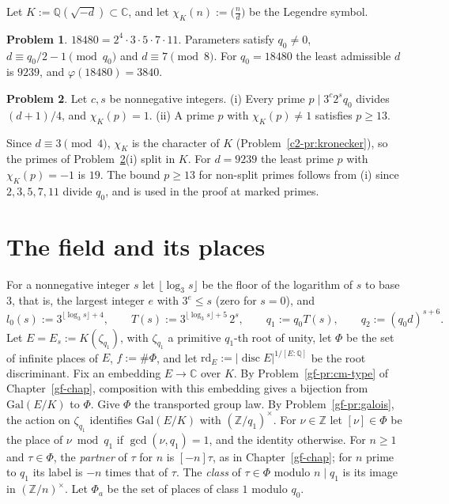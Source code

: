 \documentclass[reqno]{amsart}
\newcounter{chap}
\theoremstyle{plain}
\theoremstyle{definition}
\newtheorem{problem}{Problem}[section]
\newcommand{\Z}{{\mathbb{Z}}}
\newcommand{\Q}{{\mathbb{Q}}}
\newcommand{\C}{{\mathbb{C}}}
\newcommand{\rd}{\mathrm{rd}}
\begin{document}
Let \(K := \Q(\sqrt{-d}) \subset \C\), and let \(\chi_K(n) := \bigl(\frac nd\bigr)\) be the Legendre symbol.

\begin{problem}\label{pr:class}
\(18480 = 2^4 \cdot 3 \cdot 5 \cdot 7 \cdot 11\).  Parameters satisfy \(q_0 \ne 0\), \(d \equiv q_0/2 - 1 \pmod{q_0}\) and \(d \equiv 7 \pmod 8\).  For \(q_0 = 18480\) the least admissible \(d\) is \(9239\), and \(\varphi(18480) = 3840\).
\end{problem}

\begin{problem}\label{pr:split}
Let \(c, s\) be nonnegative integers.  (i) Every prime \(p \mid 3^c 2^s q_0\) divides \((d+1)/4\), and \(\chi_K(p) = 1\).  (ii) A prime \(p\) with \(\chi_K(p) \ne 1\) satisfies \(p \ge 13\).
\end{problem}

Since \(d \equiv 3 \pmod 4\), \(\chi_K\) is the character of \(K\) (Problem~\ref{c2-pr:kronecker}), so the primes of Problem~\ref{pr:split}(i) split in \(K\).  For \(d = 9239\) the least prime \(p\) with \(\chi_K(p) = -1\) is \(19\).
The bound \(p \ge 13\) for non-split primes follows from (i) since \(2, 3, 5, 7, 11\) divide \(q_0\), and is used in the proof at marked primes.

\section{The field and its places}\label{sec:field}

For a nonnegative integer \(s\) let \(\lfloor \log_3 s \rfloor\) be the floor of the logarithm of \(s\) to base \(3\), that is, the largest integer \(e\) with \(3^e \le s\) (zero for \(s = 0\)), and
\[
  l_0(s) := 3^{\lfloor \log_3 s \rfloor + 4}, \qquad
  T(s) := 3^{\lfloor \log_3 s \rfloor + 5}\, 2^s, \qquad
  q_1 := q_0 T(s), \qquad q_2 := (q_0 d)^{s+6}.
\]
Let \(E = E_s := K(\zeta_{q_1})\), with \(\zeta_{q_1}\) a primitive \(q_1\)-th root of unity, let \(\Phi\) be the set of infinite places of \(E\), \(f := \#\Phi\), and let \(\rd_E := \lvert \operatorname{disc} E \rvert^{1/[E:\Q]}\) be the root discriminant.  Fix an embedding \(E \to \C\) over \(K\).  By Problem~\ref{gf-pr:cm-type} of Chapter~\ref{gf-chap}, composition with this embedding gives a bijection from \(\mathrm{Gal}(E/K)\) to \(\Phi\).  Give \(\Phi\) the transported group law.  By Problem~\ref{gf-pr:galois}, the action on \(\zeta_{q_1}\) identifies \(\mathrm{Gal}(E/K)\) with \((\Z/q_1)^\times\).  For \(\nu \in \Z\) let \([\nu] \in \Phi\) be the place of \(\nu \bmod q_1\) if \(\gcd(\nu, q_1) = 1\), and the identity otherwise.  For \(n \ge 1\) and \(\tau \in \Phi\), the \emph{partner} of \(\tau\) for \(n\) is \([-n]\tau\), as in Chapter~\ref{gf-chap}; for \(n\) prime to \(q_1\) its label is \(-n\) times that of \(\tau\).  The \emph{class} of \(\tau \in \Phi\) modulo \(n \mid q_1\) is its image in \((\Z/n)^\times\).  Let \(\Phi_a\) be the set of places of class \(1\) modulo \(q_0\).
\end{document}
